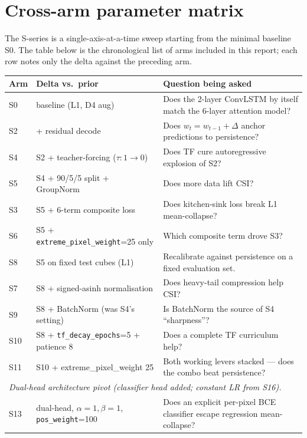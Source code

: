 \section{Cross-arm parameter matrix}

The S-series is a single-axis-at-a-time sweep starting from the
minimal baseline S0. The table below is the chronological list of arms
included in this report; each row notes only the delta against the
preceding arm.

\begin{table}[h]
\centering\footnotesize
\begin{tabular}{@{}l p{5.4cm} p{8.2cm}@{}}
\toprule
Arm & Delta vs.\ prior & Question being asked \\
\midrule
\rowcolor{tabhdr}S0 & baseline (L1, D4 aug)              & Does the 2-layer ConvLSTM by itself match the 6-layer attention model? \\
S2 & + residual decode                                  & Does \(w_t = w_{t-1} + \Delta\) anchor predictions to persistence? \\
\rowcolor{tabhdr}S4 & S2 + teacher-forcing (\(\tau{:}1\!\to\!0\)) & Does TF cure autoregressive explosion of S2? \\
S5 & S4 + 90/5/5 split + GroupNorm                       & Does more data lift CSI? \\
\rowcolor{tabhdr}S3 & S5 + 6-term composite loss          & Does kitchen-sink loss break L1 mean-collapse? \\
S6 & S5 + \texttt{extreme\_pixel\_weight}{=}25 only      & Which composite term drove S3? \\
\rowcolor{tabhdr}S8 & S5 on fixed test cubes (L1)         & Recalibrate against persistence on a fixed evaluation set. \\
S7 & S8 + signed-asinh normalisation                    & Does heavy-tail compression help CSI? \\
\rowcolor{tabhdr}S9 & S8 + BatchNorm (was S4's setting)   & Is BatchNorm the source of S4 ``sharpness''? \\
S10 & S8 + \texttt{tf\_decay\_epochs}{=}5 + patience 8    & Does a complete TF curriculum help? \\
\rowcolor{tabhdr}S11 & S10 + extreme\_pixel\_weight 25    & Both working levers stacked --- does the combo beat persistence? \\
\midrule
\multicolumn{3}{l}{\textit{Dual-head architecture pivot (classifier head added; constant LR from S16).}}\\
\midrule
\rowcolor{tabhdr}S13 & dual-head, \(\alpha{=}1, \beta{=}1\), \texttt{pos\_weight}{=}100 & Does an explicit per-pixel BCE classifier escape regression mean-collapse? \\

\end{tabular}
\end{table}
